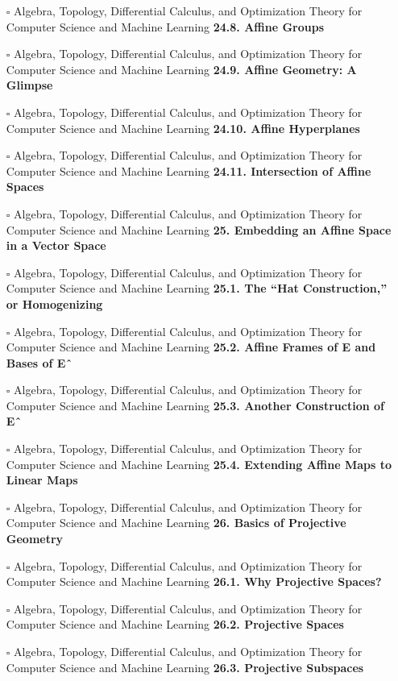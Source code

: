 \documentclass[a4, landscape, 12pt]{article}
\newcommand{\checkbox}{$\square$}%
\begin{document}
\begin{itemize}
{}
\item [\checkbox]  Algebra, Topology, Differential Calculus, and Optimization Theory for Computer Science and Machine Learning \textbf{ 24.8. Affine Groups
}
\item [\checkbox]  Algebra, Topology, Differential Calculus, and Optimization Theory for Computer Science and Machine Learning \textbf{ 24.9. Affine Geometry: A Glimpse
}
\item [\checkbox]  Algebra, Topology, Differential Calculus, and Optimization Theory for Computer Science and Machine Learning \textbf{ 24.10. Affine Hyperplanes
}
\item [\checkbox]  Algebra, Topology, Differential Calculus, and Optimization Theory for Computer Science and Machine Learning \textbf{ 24.11. Intersection of Affine Spaces
}
\item [\checkbox]  Algebra, Topology, Differential Calculus, and Optimization Theory for Computer Science and Machine Learning \textbf{ 25. Embedding an Affine Space in a Vector Space
}
\item [\checkbox]  Algebra, Topology, Differential Calculus, and Optimization Theory for Computer Science and Machine Learning \textbf{ 25.1. The “Hat Construction,” or Homogenizing
}
\item [\checkbox]  Algebra, Topology, Differential Calculus, and Optimization Theory for Computer Science and Machine Learning \textbf{ 25.2. Affine Frames of E and Bases of Eˆ
}
\item [\checkbox]  Algebra, Topology, Differential Calculus, and Optimization Theory for Computer Science and Machine Learning \textbf{ 25.3. Another Construction of Eˆ
}
\item [\checkbox]  Algebra, Topology, Differential Calculus, and Optimization Theory for Computer Science and Machine Learning \textbf{ 25.4. Extending Affine Maps to Linear Maps
}
\item [\checkbox]  Algebra, Topology, Differential Calculus, and Optimization Theory for Computer Science and Machine Learning \textbf{ 26. Basics of Projective Geometry
}
\item [\checkbox]  Algebra, Topology, Differential Calculus, and Optimization Theory for Computer Science and Machine Learning \textbf{ 26.1. Why Projective Spaces?
}
\item [\checkbox]  Algebra, Topology, Differential Calculus, and Optimization Theory for Computer Science and Machine Learning \textbf{ 26.2. Projective Spaces
}
\item [\checkbox]  Algebra, Topology, Differential Calculus, and Optimization Theory for Computer Science and Machine Learning \textbf{ 26.3. Projective Subspaces
}
\end{itemize}
\end{document}

